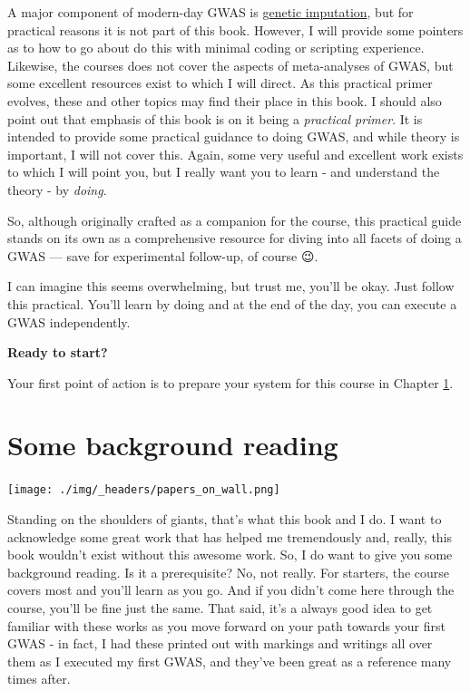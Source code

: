 \documentclass[
]{book}
\begin{document}
A major component of modern-day GWAS is \href{https://www.nature.com/articles/nrg2796}{genetic imputation}, but for practical reasons it is not part of this book. However, I will provide some pointers as to how to go about do this with minimal coding or scripting experience. Likewise, the courses does not cover the aspects of meta-analyses of GWAS, but some excellent resources exist to which I will direct. As this practical primer evolves, these and other topics may find their place in this book.
I should also point out that emphasis of this book is on it being a \emph{practical primer}. It is intended to provide some practical guidance to doing GWAS, and while theory is important, I will not cover this. Again, some very useful and excellent work exists to which I will point you, but I really want you to learn - and understand the theory - by \emph{doing}.

So, although originally crafted as a companion for the course, this practical guide stands on its own as a comprehensive resource for diving into all facets of doing a GWAS --- save for experimental follow-up, of course 😉.

I can imagine this seems overwhelming, but trust me, you'll be okay. Just follow this practical. You'll learn by doing and at the end of the day, you can execute a GWAS independently.

\textbf{Ready to start?}

Your first point of action is to prepare your system for this course in Chapter \ref{somebackgroundreading}.

\hypertarget{somebackgroundreading}{%
\chapter{Some background reading}\label{somebackgroundreading}}

\texttt{[image: ./img/\_headers/papers\_on\_wall.png]}

Standing on the shoulders of giants, that's what this book and I do. I want to acknowledge some great work that has helped me tremendously and, really, this book wouldn't exist without this awesome work. So, I do want to give you some background reading. Is it a prerequisite? No, not really. For starters, the course covers most and you'll learn as you go. And if you didn't come here through the course, you'll be fine just the same. That said, it's a always good idea to get familiar with these works as you move forward on your path towards your first GWAS - in fact, I had these printed out with markings and writings all over them as I executed my first GWAS, and they've been great as a reference many times after.
\end{document}
